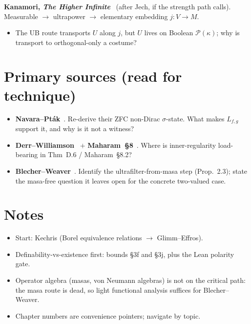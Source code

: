 \noindent\textbf{Kanamori, \emph{The Higher Infinite}}~\cite{Kanamori2009} (after Jech, if
the strength path calls). Measurable $\to$ ultrapower $\to$ elementary embedding
$j\colon V\to M$.
\begin{itemize}[leftmargin=*]
  \item The UB route transports $U$ along $j$, but $U$ lives on Boolean
    $\mathcal{P}(\kappa)$; why is transport to orthogonal-only a costume?
\end{itemize}

\section{Primary sources (read for technique)}

\begin{itemize}[leftmargin=*]
  \item \textbf{Navara--Pt\'ak}~\cite{NavaraPtak1983}. Re-derive their ZFC non-Dirac
    $\sigma$-state. What makes $L_{f,g}$ support it, and why is it not a witness?
  \item \textbf{Derr--Williamson}~\cite{DerrWilliamson2023} $+$
    \textbf{Maharam~\S8}~\cite{Maharam1972}. Where is inner-regularity load-bearing in
    Thm~D.6 / Maharam~\S8.2?
  \item \textbf{Blecher--Weaver}~\cite{BlecherWeaver2017}. Identify the
    ultrafilter-from-masa step (Prop.~2.3); state the masa-free question it leaves open for
    the concrete two-valued case.
\end{itemize}

\section{Notes}

\begin{itemize}[leftmargin=*]
  \item Start: Kechris (Borel equivalence relations $\to$ Glimm--Effros).
  \item Definability-vs-existence first: bounds \S3f and \S3j, plus the Lean polarity gate.
  \item Operator algebra (masas, von Neumann algebras) is not on the critical path: the
    masa route is dead, so light functional analysis suffices for Blecher--Weaver.
  \item Chapter numbers are convenience pointers; navigate by topic.
\end{itemize}
